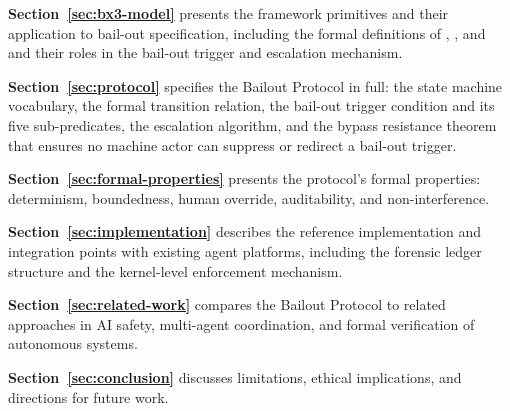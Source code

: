 \textbf{Section~\ref{sec:bx3-model}} presents the \bxthree{} framework primitives and their application to bail-out specification, including the formal definitions of \purpose, \bounds, and \fact and their roles in the bail-out trigger and escalation mechanism.

\textbf{Section~\ref{sec:protocol}} specifies the Bailout Protocol in full: the state machine vocabulary, the formal transition relation, the bail-out trigger condition and its five sub-predicates, the escalation algorithm, and the bypass resistance theorem that ensures no machine actor can suppress or redirect a bail-out trigger.

\textbf{Section~\ref{sec:formal-properties}} presents the protocol's formal properties: determinism, boundedness, human override, auditability, and non-interference.

\textbf{Section~\ref{sec:implementation}} describes the reference implementation and integration points with existing agent platforms, including the forensic ledger structure and the kernel-level enforcement mechanism.

\textbf{Section~\ref{sec:related-work}} compares the Bailout Protocol to related approaches in AI safety, multi-agent coordination, and formal verification of autonomous systems.

\textbf{Section~\ref{sec:conclusion}} discusses limitations, ethical implications, and directions for future work.
